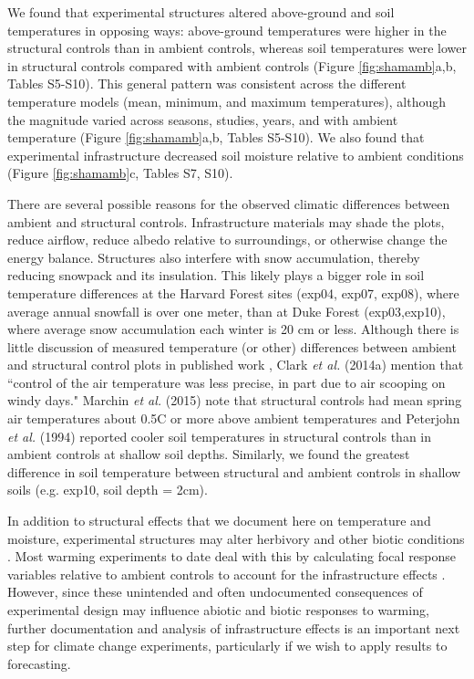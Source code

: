 \documentclass{article}
\begin{document}
\par We found that experimental structures altered above-ground and soil temperatures in opposing ways: above-ground temperatures were higher in the structural controls than in ambient controls, whereas soil temperatures were lower in structural controls compared with ambient controls (Figure \ref{fig:shamamb}a,b, Tables S5-S10). This general pattern was consistent across the different temperature models (mean, minimum, and maximum temperatures), although the magnitude varied across seasons, studies, years, and with ambient temperature (Figure \ref{fig:shamamb}a,b, Tables S5-S10). We also found that experimental infrastructure decreased soil moisture relative to ambient conditions (Figure \ref{fig:shamamb}c, Tables S7, S10). 

\par There are several possible reasons for the observed climatic differences between ambient and structural controls. Infrastructure materials may shade the plots, reduce airflow, reduce albedo relative to surroundings, or otherwise change the energy balance. Structures also interfere with snow accumulation, thereby reducing snowpack and its insulation. %
This likely plays a bigger role in soil temperature differences at the Harvard Forest sites (exp04, exp07, exp08), where average annual snowfall is over one meter, than at Duke Forest (exp03,exp10), where average snow accumulation each winter is 20 cm or less. Although there is little discussion of measured temperature (or other) differences between ambient and structural control plots in published work \citep[e.g.,][]{farnsworth1995,pelini2011,clark2014a,clark2014b}, Clark \textit{et al.} (2014a) mention that ``control of the air temperature was less precise, in part due to air scooping on windy days." Marchin \textit{et al.} (2015) note that structural controls had mean spring air temperatures about  0.5\degree C or more above ambient temperatures and Peterjohn \textit{et al.} (1994) reported cooler soil temperatures in structural controls than in ambient controls at shallow soil depths. Similarly, we found the greatest difference in soil temperature between structural and ambient controls in shallow soils (e.g. exp10, soil depth = 2cm).  
\par In addition to structural effects that we document here on temperature and moisture, experimental structures may alter herbivory and other biotic conditions \citep{kennedy1995,moise2010,wolkovich2012,hoeppner2012}. Most warming experiments to date deal with this by calculating focal response variables relative to ambient controls to account for the infrastructure effects \citep [e.g.,][]{marchin2015}. However, since these unintended and often undocumented consequences of experimental design may influence abiotic and biotic responses to warming, further documentation and analysis of infrastructure effects is an important next step for climate change experiments, particularly if we wish to apply results to forecasting.
\end{document}
